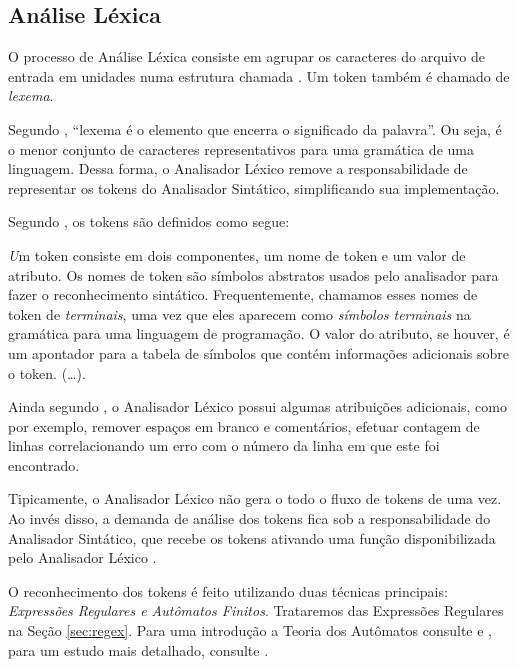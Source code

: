 \subsection{Análise Léxica}

O processo de Análise Léxica consiste em agrupar os caracteres do arquivo de
entrada em unidades numa estrutura chamada \token. Um token também é chamado
de \emph{lexema}.

Segundo , ``lexema é o elemento que encerra o
significado da palavra''. Ou seja, é o menor conjunto de caracteres
representativos para uma gramática de uma linguagem. Dessa forma, o Analisador
Léxico remove a responsabilidade de representar os tokens do Analisador
Sintático, simplificando sua implementação.

Segundo , os tokens são definidos como segue:

\begin{citacao}{4cm}{0cm}\footnotesize \emph
	Um token consiste em dois componentes, um nome de token e um valor de
	atributo. Os nomes de token são símbolos abstratos usados pelo analisador para
	fazer o reconhecimento sintático. Frequentemente, chamamos esses nomes de
	token de \emph{terminais}, uma vez que eles aparecem como \emph{símbolos
	terminais} na gramática para uma linguagem de programação. O valor do
	atributo, se houver, é um apontador para a tabela de símbolos que contém
	informações adicionais sobre o token. (\ldots).
\end{citacao}

Ainda segundo , o Analisador Léxico possui algumas
atribuições adicionais, como por exemplo, remover espaços em branco e
comentários, efetuar contagem de linhas correlacionando um erro com o número
da linha em que este foi encontrado.

Tipicamente, o Analisador Léxico não gera o todo o fluxo de tokens de uma vez.
Ao invés disso, a demanda de análise dos tokens fica sob a responsabilidade do
Analisador Sintático, que recebe os tokens ativando uma função disponibilizada
pelo Analisador Léxico \cite{louden97-pt}.

O reconhecimento dos tokens é feito utilizando duas técnicas principais:
\emph{Expressões Regulares e Autômatos Finitos}. Trataremos das Expressões
Regulares na Seção \ref{sec:regex}. Para uma introdução a Teoria dos Autômatos
consulte  e  , para um estudo
mais detalhado, consulte .

